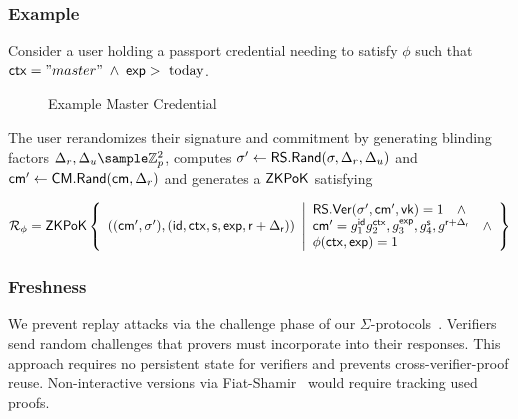 \subsubsection{Example}
Consider a user holding a passport credential needing to satisfy $\phi$ such that $\mathsf{ctx}="master" \; \wedge \; \mathsf{exp} > \text{ today}$. 

\begin{figure}[htbp]
        \begin{pchstack}[boxed, center, space=4em]
            \begin{pcvstack}
            \end{pcvstack}
        \end{pchstack}
    \caption{Example Master Credential}
    \label{fig:master-cred}
\end{figure}

The user rerandomizes their signature and commitment by generating blinding factors $\Delta_r, \Delta_u \sample \Z_p^2$, computes $\sigma' \gets \mathsf{RS.Rand}(\sigma, \Delta_r, \Delta_u)$ and $\mathsf{cm}' \gets \mathsf{CM.Rand}(\mathsf{cm}, \Delta_r)$ and generates a ${\mathsf{ZKPoK}}$ satisfying 

     \[
    \mathcal{R}_\phi = {\mathsf{ZKPoK}} \left\{ 
    \begin{array}{l} 
    ((\mathsf{cm}', \sigma'),(\mathsf{id}, \mathsf{ctx}, \mathsf{s}, \mathsf{exp}, \mathsf{r}+\Delta_{\mathsf{r}})) \\
    \end{array} 
    \middle|
    \begin{array}{l}
    \mathsf{RS.Ver}(\sigma', \mathsf{cm}', \mathsf{vk}) = 1 \quad \wedge \\
    \mathsf{cm}' = g_1^{\mathsf{id}}g_2^{\mathsf{ctx}},g_3^{\mathsf{exp}},g_4^{\mathsf{s}}, g^{\mathsf{r}+\Delta_{\mathsf{r}}} \quad \wedge  \\
    \phi(\mathsf{ctx}, \mathsf{exp}) = 1
    \end{array} 
    \right\}
    \]




\subsubsection{Freshness}
We prevent replay attacks via the challenge phase of our $\Sigma$-protocols~\cite{desmedt_proofs_1994, damgard_sigma_2010}. Verifiers send random challenges that provers must incorporate into their responses. This approach requires no persistent state for verifiers and prevents cross-verifier-proof reuse. Non-interactive versions via Fiat-Shamir~\cite{odlyzko_how_1986} would require tracking used proofs.

